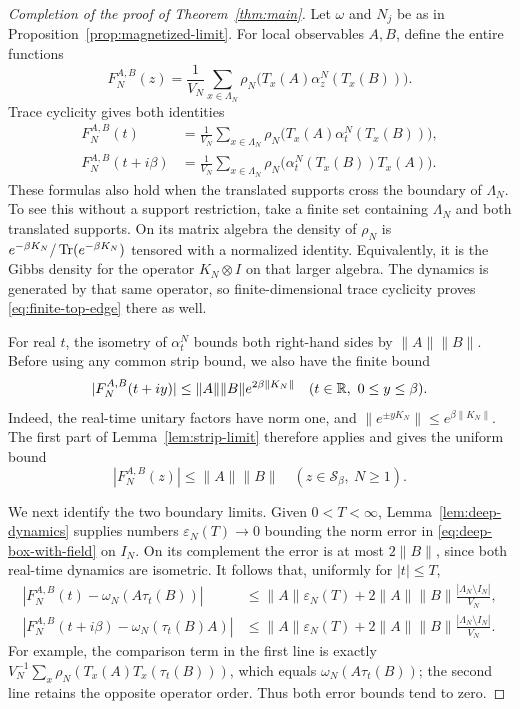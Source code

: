 \begin{proof}[Completion of the proof of Theorem~\ref{thm:main}]
Let \(\omega\) and \(N_j\) be as in
Proposition~\ref{prop:magnetized-limit}.  For local observables
\(A,B\), define the entire functions
\begin{equation}\label{eq:finite-strip-functions}
 F_N^{A,B}(z)=\frac1{V_N}\sum_{x\in\Lambda_N}
       \rho_N\bigl(T_x(A)\alpha_z^N(T_x(B))\bigr).
\end{equation}
Trace cyclicity gives both identities
\begin{align}
 F_N^{A,B}(t)
 &=\frac1{V_N}\sum_{x\in\Lambda_N}
       \rho_N\bigl(T_x(A)\alpha_t^N(T_x(B))\bigr),
       \label{eq:finite-bottom-edge}\\
 F_N^{A,B}(t+i\beta)
 &=\frac1{V_N}\sum_{x\in\Lambda_N}
       \rho_N\bigl(\alpha_t^N(T_x(B))T_x(A)\bigr).
       \label{eq:finite-top-edge}
\end{align}
These formulas also hold when the translated supports cross the
boundary of \(\Lambda_N\).  To see this without a support
restriction, take a finite set containing \(\Lambda_N\) and both
translated supports.  On its matrix algebra the density of \(\rho_N\)
is \(e^{-\beta K_N}/\operatorname{Tr}(e^{-\beta K_N})\) tensored with a normalized
identity.  Equivalently, it is the Gibbs density for the operator
\(K_N\otimes I\) on that larger algebra.  The dynamics is generated
by that same operator, so finite-dimensional trace cyclicity proves
\eqref{eq:finite-top-edge} there as well.

For real \(t\), the isometry of \(\alpha_t^N\) bounds both
right-hand sides by \(\|A\|\|B\|\).  Before using any common strip
bound, we also have the finite bound
\[
 |F_N^{A,B}(t+iy)|
 \leq \|A\|\|B\|e^{2\beta\|K_N\|}
 \quad(t\in\mathbb R,\ 0\leq y\leq\beta).
\]
Indeed, the real-time unitary factors have norm one, and
\(\|e^{\pm yK_N}\|\leq e^{\beta\|K_N\|}\).
The first part of Lemma~\ref{lem:strip-limit} therefore applies and
gives the uniform bound
\begin{equation}\label{eq:strip-product-bound}
 |F_N^{A,B}(z)|\leq\|A\|\|B\|
       \quad(z\in\mathcal S_\beta,\ N\geq1).
\end{equation}

We next identify the two boundary limits.  Given \(0<T<\infty\),
Lemma~\ref{lem:deep-dynamics} supplies numbers \(\varepsilon_N(T)\to0\)
bounding the norm error in \eqref{eq:deep-box-with-field} on \(I_N\).
On its complement the error is at most \(2\|B\|\), since both
real-time dynamics are isometric.  It follows that, uniformly for
\(|t|\leq T\),
\begin{align}
 \left|F_N^{A,B}(t)-\omega_N(A\tau_t(B))\right|
 &\leq\|A\|\varepsilon_N(T)
   +2\|A\|\|B\|\frac{|\Lambda_N\setminus I_N|}{V_N},
       \label{eq:bottom-edge-error}\\
 \left|F_N^{A,B}(t+i\beta)-\omega_N(\tau_t(B)A)\right|
 &\leq\|A\|\varepsilon_N(T)
   +2\|A\|\|B\|\frac{|\Lambda_N\setminus I_N|}{V_N}.
       \label{eq:top-edge-error}
\end{align}
For example, the comparison term in the first line is exactly
\(V_N^{-1}\sum_x\rho_N(T_x(A)T_x(\tau_t(B)))\), which equals
\(\omega_N(A\tau_t(B))\); the second line retains the opposite
operator order.  Thus both error bounds tend to zero.


\end{proof}
